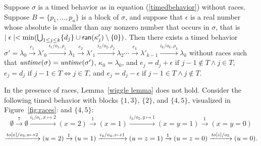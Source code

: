 \begin{lemma}
\label{wiggle lemma}
Suppose $\sigma$ is a timed behavior as in equation (\ref{timedbehavior}) without races.
Suppose $B = \{ p_1 ,\ldots, p_u \}$ is a block of $\sigma$, and suppose
that $\epsilon$ is a real number whose absolute is smaller than any nonzero number that occurs in $\sigma$, that is
$\mid \epsilon \mid  < \min (\bigcup_{1 \leq j \leq k} \{ d_j \} \cup {\textsf{ran}}(\kappa'_j) \setminus \{ 0 \} )$.
Then there exists a timed behavior
$\sigma'  =  \lambda_0 \xrightarrow{e_1} \lambda'_0 \xrightarrow{i_1/o_1, \rho_1} \lambda_1 \xrightarrow{e_2} \lambda'_1 \xrightarrow{i_2/o_2, \rho_2} \lambda_2 \cdots
\xrightarrow{e_k} \lambda'_{k-1} \xrightarrow{i_k/o_k, \rho_k} \lambda_{k}$
without races such that
$\mathit{untime}(\sigma)=\mathit{untime}(\sigma')$,
$\kappa_0 = \lambda_0$, and
$e_j  =  d_j + \epsilon  \mbox{ if } j-1 \not\in T \wedge j \in T$,
$e_j = d_j  \mbox{ if } j-1 \in T \Leftrightarrow j \in T$, and
$e_j = d_j - \epsilon  \mbox{ if } j-1 \in T \wedge j \not\in T$.
\end{lemma}
In the presence of races, Lemma~\ref{wiggle lemma} does not hold. 
Consider the following timed behavior with blocks $\{ 1, 3 \}$, $\{ 2 \}$,
\iflong 
and $\{ 4, 5 \}$, visualized in Figure~\ref{fig:races}:
\else
and $\{ 4, 5 \}$:
\fi
\[
\emptyset \xrightarrow{7} \emptyset \xrightarrow{i_1/o_1, x \mapsto 2} (x=2) \xrightarrow{1} (x=1)
\xrightarrow{i_2/o_2, y \mapsto 1} (x=y=1) \xrightarrow{1} (x=y=0) 
\]
\[
\xrightarrow{\mathit{to}[x]/o_3, u \mapsto 2} (u=2)
\xrightarrow{1} (u=1)
\xrightarrow{i_4/o_4, z \mapsto 1} (u=z=1)
\xrightarrow{1} (u=z=0)\xrightarrow{\mathit{to}[z]/o_5} (u=0).
\]

